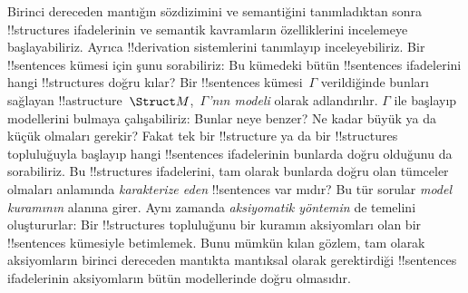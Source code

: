



Birinci dereceden mantığın sözdizimini ve semantiğini tanımladıktan
sonra !!{structure}s ifadelerinin ve semantik kavramların özelliklerini
incelemeye başlayabiliriz. Ayrıca !!{derivation} sistemlerini tanımlayıp
inceleyebiliriz. Bir !!{sentence}s kümesi için şunu sorabiliriz: Bu
kümedeki bütün !!{sentence}s ifadelerini hangi !!{structure}s doğru
kılar? Bir !!{sentence}s kümesi~$\Gamma$ verildiğinde bunları sağlayan
!!a{structure}~$\Struct M$,~\emph{$\Gamma$'nın modeli} olarak
adlandırılır. $\Gamma$ ile başlayıp modellerini bulmaya çalışabiliriz:
Bunlar neye benzer? Ne kadar büyük ya da küçük olmaları gerekir? Fakat
tek bir !!{structure} ya da bir !!{structure}s topluluğuyla başlayıp
hangi !!{sentence}s ifadelerinin bunlarda doğru olduğunu da sorabiliriz.
Bu !!{structure}s ifadelerini, tam olarak bunlarda doğru olan tümceler
olmaları anlamında \emph{karakterize eden} !!{sentence}s var mıdır?
Bu tür sorular \emph{model kuramının} alanına girer. Aynı zamanda
\emph{aksiyomatik yöntemin} de temelini oluştururlar: Bir
!!{structure}s topluluğunu bir kuramın aksiyomları olan bir
!!{sentence}s kümesiyle betimlemek. Bunu mümkün kılan gözlem, tam
olarak aksiyomların birinci dereceden mantıkta mantıksal olarak
gerektirdiği !!{sentence}s ifadelerinin aksiyomların bütün modellerinde
doğru olmasıdır.

